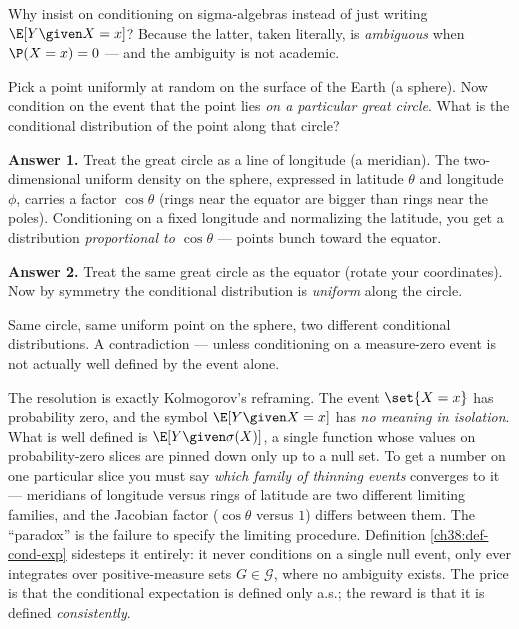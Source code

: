 Why insist on conditioning on sigma-algebras instead of just writing $\E[Y \given X = x]$? Because the
latter, taken literally, is \emph{ambiguous} when $\P(X = x) = 0$ --- and the ambiguity is not
academic.

\begin{paradoxbox}
Pick a point uniformly at random on the surface of the Earth (a sphere). Now condition on the event
that the point lies \emph{on a particular great circle}. What is the conditional distribution of the
point along that circle?

\textbf{Answer 1.} Treat the great circle as a line of longitude (a meridian). The two-dimensional
uniform density on the sphere, expressed in latitude $\theta$ and longitude $\phi$, carries a factor
$\cos\theta$ (rings near the equator are bigger than rings near the poles). Conditioning on a fixed
longitude and normalizing the latitude, you get a distribution \emph{proportional to $\cos\theta$} ---
points bunch toward the equator.

\textbf{Answer 2.} Treat the same great circle as the equator (rotate your coordinates). Now by
symmetry the conditional distribution is \emph{uniform} along the circle.

Same circle, same uniform point on the sphere, two different conditional distributions. A
contradiction --- unless conditioning on a measure-zero event is not actually well defined by the
event alone.
\end{paradoxbox}

\begin{whybox}[Resolving it]
The resolution is exactly Kolmogorov's reframing. The event $\set{X = x}$ has probability zero, and
the symbol $\E[Y \given X = x]$ has \emph{no meaning in isolation}. What is well defined is
$\E[Y\given\sigma(X)]$, a single function whose values on probability-zero slices are pinned down only
up to a null set. To get a number on one particular slice you must say \emph{which family of thinning
events} converges to it --- meridians of longitude versus rings of latitude are two different limiting
families, and the Jacobian factor ($\cos\theta$ versus $1$) differs between them. The ``paradox'' is
the failure to specify the limiting procedure. Definition \ref{ch38:def-cond-exp} sidesteps it
entirely: it never conditions on a single null event, only ever integrates over positive-measure sets
$G \in \mathcal{G}$, where no ambiguity exists. The price is that the conditional expectation is
defined only a.s.; the reward is that it is defined \emph{consistently}.
\end{whybox}

